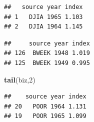\documentclass[
]{book}
\newenvironment{Shaded}{\begin{snugshade}}{\end{snugshade}}
\newcommand{\DecValTok}[1]{\textcolor[rgb]{0.00,0.00,0.81}{#1}}
\newcommand{\DocumentationTok}[1]{\textcolor[rgb]{0.56,0.35,0.01}{\textbf{\textit{#1}}}}
\newcommand{\FunctionTok}[1]{\textcolor[rgb]{0.13,0.29,0.53}{\textbf{#1}}}
\newcommand{\NormalTok}[1]{#1}
\newcommand{\OtherTok}[1]{\textcolor[rgb]{0.56,0.35,0.01}{#1}}
\newcommand{\SpecialCharTok}[1]{\textcolor[rgb]{0.81,0.36,0.00}{\textbf{#1}}}
\begin{document}
\begin{verbatim}
##   source year index
## 1   DJIA 1965 1.103
## 2   DJIA 1964 1.145
\end{verbatim}

\begin{Shaded}
\end{Shaded}

\begin{verbatim}
##     source year index
## 126  BWEEK 1948 1.019
## 125  BWEEK 1949 0.995
\end{verbatim}

\begin{Shaded}
\begin{Highlighting}[]
\FunctionTok{tail}\NormalTok{(biz,}\DecValTok{2}\NormalTok{)}
\end{Highlighting}
\end{Shaded}

\begin{verbatim}
##    source year index
## 20   POOR 1964 1.131
## 19   POOR 1965 1.099
\end{verbatim}
\end{document}
